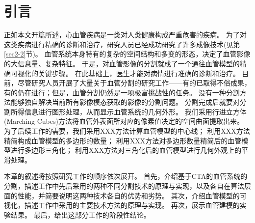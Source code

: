 \section{引言}
\label{sec3-1}

正如本文开篇所述，心血管疾病是一类对人类健康构成严重危害的疾病。
为了对这类疾病进行精确的诊断和治疗，研究人员已经成功研究了许多成像技术(见第\ref{sec2-2}节)。
血管系统本身特有的复杂的空间结构和多变的形态，决定了血管影像的大信息量、复杂特征。
于是，对血管影像的分割就成了一个通往血管模型的精确可视化的关键步骤。
在此基础上，医生才能对病情进行准确的诊断和治疗。
目前，尽管研究人员开展了大量关于血管分割的研究工作——有的已取得不俗成果，有的仍在进行；但是，血管分割仍然是一项极富挑战性的任务\cite{Lesage2009Review}。
没有一种分割方法能够独自解决当前所有影像模态获取的影像的分割问题。
分割完成后就要对分割所得信息进行图形处理，从而显示血管系统的几何外形。
我们采用行进立方体(Marching Cubes)方法\cite{Lorensen1987MC}将血管外表面所对应的像素值决定的空间曲面提取出来。
为了后续工作的需要，我们采用XXX方法计算血管模型的中心线；
利用XXX方法精简构成血管模型的多边形的数量；
利用XXX方法对多边形数量精简后的血管模型进行多边形三角化；
利用XXX方法对三角化后的血管模型进行几何外观上的平滑处理。

本章的叙述将按照研究工作的顺序依次展开。
首先，介绍基于CTA的血管系统的分割，描述工作中先后采用的两种不同分割技术的原理与实现，以及各自在算法层面的性能，并简要说明这两种技术各自的优势和劣势。
其次，介绍血管模型的可视化，描述工作中采用的主要技术方法的原理与实现。
再次，展示血管建模的实验结果。
最后，给出这部分工作的阶段性结论。